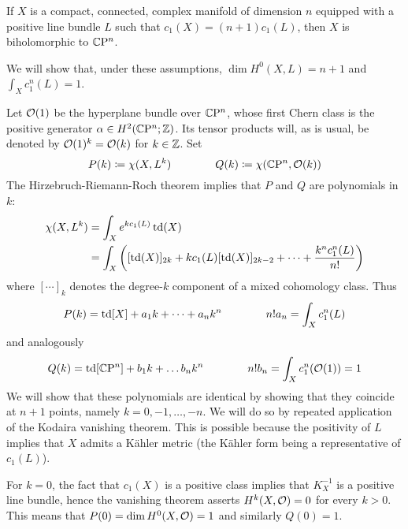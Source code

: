 \begin{cor}
	If $X$ is a compact, connected, complex manifold of dimension $n$ equipped with a positive line bundle $L$ such that $c_1(X)=(n+1)c_1(L)$, then $X$ is biholomorphic to $\mathbb{C}\mathrm{P}^n$.
\end{cor}
\begin{myproof}
	We will show that, under these assumptions, $\dim H^0(X,L)=n+1$ and $\int_X c_1^n(L)=1$. 
	
	Let $\mathcal{O}(1)$ be the hyperplane bundle over $\mathbb{C}\mathrm{P}^n$, whose first Chern class is the positive generator $\alpha\in H^2(\mathbb{C}\mathrm{P}^n;\mathbb{Z})$. Its tensor products will, as is usual, be denoted by $\mathcal{O}(1)^k=\mathcal{O}(k)$ for $k\in\mathbb{Z}$. Set
	\begin{equation*}
		P(k)\coloneqq \chi(X,L^k) \qquad \qquad Q(k)\coloneqq \chi(\mathbb{C}\mathrm{P}^n,\mathcal{O}(k))
	\end{equation*}
	The Hirzebruch-Riemann-Roch theorem implies that $P$ and $Q$ are polynomials in $k$: 
	\begin{align*}
		\chi(X,L^k)&=\int_X e^{kc_1(L)}\operatorname{td}(X)\\
		&=\int_X \bigg([\operatorname{td}(X)]_{2k}+kc_1(L)[\operatorname{td}(X)]_{2k-2}+\dots 
		+\frac{k^nc_1^n(L)}{n!}\bigg)
	\end{align*}
	where $[\cdots]_k$ denotes the degree-$k$ component of a mixed cohomology class. Thus
	\begin{equation*}
		P(k)=\operatorname{td}[X]+a_1k+\dots +a_n k^n \qquad \qquad 
		n! a_n=\int_X c_1^n(L)
	\end{equation*}
	and analogously
	\begin{equation*}
		Q(k)=\operatorname{td}[\mathbb{C}\mathrm{P}^n]+b_1 k+\dots b_n k^n \qquad \qquad 
		n! b_n=\int_X c_1^n(\mathcal{O}(1))=1
	\end{equation*}
	We will show that these polynomials are identical by showing that they coincide at $n+1$ points, namely $k=0,-1,\dots,-n$. We will do so by repeated application of the Kodaira vanishing theorem. This is possible because the positivity of $L$ implies that $X$ admits a K\"ahler metric (the K\"ahler form being a representative of $c_1(L)$).
	
	For $k=0$, the fact that $c_1(X)$ is a positive class implies that $K_X^{-1}$ is a positive line bundle, hence the vanishing theorem asserts $H^k(X,\mathcal{O})=0$ for every $k>0$. This means that $P(0)=\dim H^0(X,\mathcal{O})=1$ and similarly $Q(0)=1$.
	

\end{myproof}
